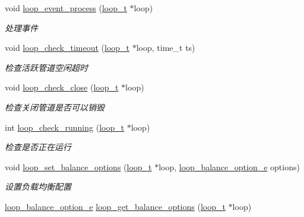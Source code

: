 \begin{DoxyCompactItemize}
void \hyperlink{a00070_a94a2dfa4ba7723d7face3f76ebf31e54_a94a2dfa4ba7723d7face3f76ebf31e54}{loop\+\_\+event\+\_\+process} (\hyperlink{a00051_a9c3ad1cd2de83e09f3a7b59fa82c94ee_a9c3ad1cd2de83e09f3a7b59fa82c94ee}{loop\+\_\+t} $\ast$loop)
\begin{DoxyCompactList}\small\item\em 处理事件 \end{DoxyCompactList}\item 
void \hyperlink{a00070_a7a6972b39402a670659621e9fa7204ce_a7a6972b39402a670659621e9fa7204ce}{loop\+\_\+check\+\_\+timeout} (\hyperlink{a00051_a9c3ad1cd2de83e09f3a7b59fa82c94ee_a9c3ad1cd2de83e09f3a7b59fa82c94ee}{loop\+\_\+t} $\ast$loop, time\+\_\+t ts)
\begin{DoxyCompactList}\small\item\em 检查活跃管道空闲超时 \end{DoxyCompactList}\item 
void \hyperlink{a00070_a5f61cefa251961e82fbf82b1c7dc0b6b_a5f61cefa251961e82fbf82b1c7dc0b6b}{loop\+\_\+check\+\_\+close} (\hyperlink{a00051_a9c3ad1cd2de83e09f3a7b59fa82c94ee_a9c3ad1cd2de83e09f3a7b59fa82c94ee}{loop\+\_\+t} $\ast$loop)
\begin{DoxyCompactList}\small\item\em 检查关闭管道是否可以销毁 \end{DoxyCompactList}\item 
int \hyperlink{a00070_a841de68dad67aba3b98d2c55d2891521_a841de68dad67aba3b98d2c55d2891521}{loop\+\_\+check\+\_\+running} (\hyperlink{a00051_a9c3ad1cd2de83e09f3a7b59fa82c94ee_a9c3ad1cd2de83e09f3a7b59fa82c94ee}{loop\+\_\+t} $\ast$loop)
\begin{DoxyCompactList}\small\item\em 检查是否正在运行 \end{DoxyCompactList}\item 
void \hyperlink{a00070_a20964027b5a498c7f206d6a04568fa11_a20964027b5a498c7f206d6a04568fa11}{loop\+\_\+set\+\_\+balance\+\_\+options} (\hyperlink{a00051_a9c3ad1cd2de83e09f3a7b59fa82c94ee_a9c3ad1cd2de83e09f3a7b59fa82c94ee}{loop\+\_\+t} $\ast$loop, \hyperlink{a00051_a6c87150c8f33855c3427c783480fd8ba_a6c87150c8f33855c3427c783480fd8ba}{loop\+\_\+balance\+\_\+option\+\_\+e} options)
\begin{DoxyCompactList}\small\item\em 设置负载均衡配置 \end{DoxyCompactList}\item 
\hyperlink{a00051_a6c87150c8f33855c3427c783480fd8ba_a6c87150c8f33855c3427c783480fd8ba}{loop\+\_\+balance\+\_\+option\+\_\+e} \hyperlink{a00070_a5098c33527e18f4a0bd9bc1856ce17f1_a5098c33527e18f4a0bd9bc1856ce17f1}{loop\+\_\+get\+\_\+balance\+\_\+options} (\hyperlink{a00051_a9c3ad1cd2de83e09f3a7b59fa82c94ee_a9c3ad1cd2de83e09f3a7b59fa82c94ee}{loop\+\_\+t} $\ast$loop)

\end{DoxyCompactItemize}
